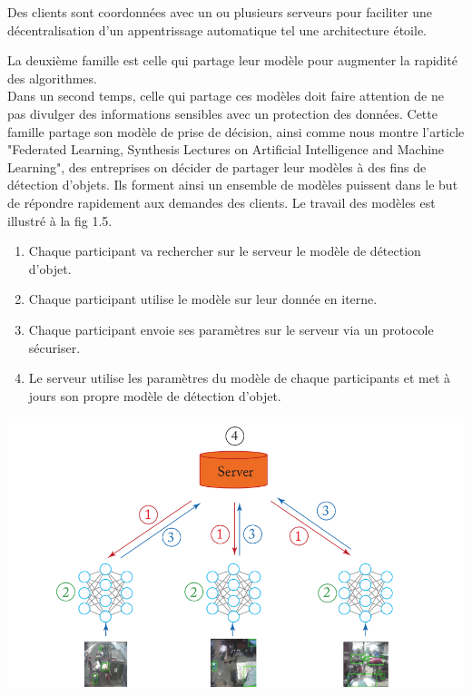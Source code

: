 \documentclass[12pt,a4paper]{report}
\begin{document}
Des clients sont coordonnées avec un ou plusieurs serveurs pour faciliter une décentralisation d'un appentrissage automatique tel une architecture étoile.






La deuxième famille est celle qui partage leur modèle pour augmenter la rapidité des algorithmes.\\ 

Dans un second temps, celle qui partage ces modèles doit faire attention de ne pas divulger des informations sensibles avec un protection des données. Cette famille partage son modèle de prise de décision, ainsi comme nous montre l'article "Federated Learning, Synthesis Lectures on Artificial Intelligence and Machine Learning", des entreprises on décider de partager leur modèles à des fins de détection d'objets. Ils forment ainsi un ensemble de modèles puissent dans le but de répondre rapidement aux demandes des clients. Le travail des modèles est illustré à la fig 1.5.

\begin{enumerate}
\item Chaque participant va rechercher sur le serveur le modèle de détection d'objet.
\item Chaque participant utilise le modèle sur leur donnée en iterne.
\item Chaque participant envoie ses paramètres sur le serveur via un protocole sécuriser.
\item Le serveur utilise les paramètres du modèle de chaque participants et met à jours son propre modèle de détection d'objet.
\end{enumerate}

\begin{center}
	\includegraphics[scale=0.4]{fl_model_partage}
	\label{fig1}
\end{center}
\end{document}
